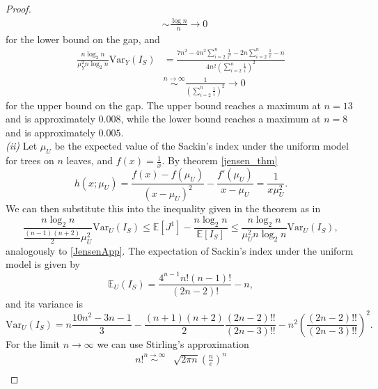 \begin{proof}
\begin{align*}
        &\sim \frac{\log n}{n} \to 0
    \end{align*}
    for the lower bound on the gap, and
    \begin{align*}
        \frac{n\log_2n}{\mu_Y^2n\log_2n}\text{Var}_Y(I_S) & = \frac{7n^2 - 4n^2
        \sum_{i=2}^n\frac{1}{i^2}-2n\sum_{i=2}^n\frac{1}{i}-n}{4n^2\left(
        \sum_{i=2}^n\frac{1}{i}\right)^2} \\
        & \stackrel{n\to\infty}{\sim} \frac{1}{\left(\sum_{i=2}^n\frac{1}{i}
        \right)^2} \to 0
    \end{align*}
    for the upper bound on the gap. The upper bound reaches a maximum at $n=13$
    and is approximately $0.008$, while the lower bound reaches a maximum at
    $n=8$ and is approximately $0.005$.\\
    \textit{(ii)} Let $\mu_U$ be the expected value of the Sackin's index under
    the uniform model for trees on $n$ leaves, and $f(x)=\frac{1}{x}$. By
    theorem \ref{jensen_thm}
    \begin{equation}\label{hxmuU}
        h(x;\mu_U) = \frac{f(x)-f(\mu_U)}{(x-\mu_U)^2} - \frac{f'(\mu_U)}
        {x-\mu_U} = \frac{1}{x\mu_U^2}.
    \end{equation}
    We can then substitute this into the inequality given in the theorem as in
    \begin{equation}\label{JensenAppU}
        \frac{n\log_2n}{\frac{(n-1)(n+2)}{2}\mu_U^2} \text{Var}_U(I_S) \leq
        \mathbb{E}[J^1] - \frac{n\log_2n}{\mathbb{E}[I_S]} \leq \frac{n\log_2n}
        {\mu_U^2n\log_2n}\text{Var}_U(I_S),
    \end{equation}
    analogously to \eqref{JensenApp}. The expectation of Sackin's index under
    the uniform model is given by \citep{cardona_exact_2012}
    \begin{equation}\label{yule_exp_sackin}
        \mathbb{E}_U(I_S) = \frac{4^{n-1}n!(n-1)!}{(2n-2)!}-n,
    \end{equation}
    and its variance is
    \begin{equation}\label{unifvarIS}
        \text{Var}_U(I_S) = n\frac{10n^2 - 3n - 1}{3} - \frac{(n+1)(n+2)}{2}
        \frac{(2n-2)!!}{(2n-3)!!}-n^2\left(\frac{(2n-2)!!}{(2n-3)!!}\right)^2.
    \end{equation}
    For the limit $n\to\infty$ we can use Stirling's approximation
    \begin{align}
        n! \stackrel{n\to\infty}{\sim} & \sqrt{2\pi n}\left(\frac{n}{e}\right)^n
        \label{stirling}\\

\end{align}
\end{proof}
